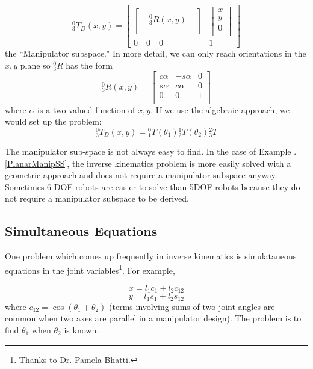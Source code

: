 \begin{ExampleSmall}
\[
^0_3T_D(x,y) =
\begin{bmatrix}
\begin{bmatrix}  &  &  \\  & ^0_3R(x,y) &   \\ & & \\ \end{bmatrix}      &
 \begin{bmatrix} x \\ y \\  0  \\ \end{bmatrix}            \\
 0 \quad 0 \quad 0      &   1
\end{bmatrix}
\]
the ``Manipulator subspace."  In more detail, we can only reach orientations in the $x,y$ plane so $^0_3R$ has the form
\[
{^0_3R}(x,y) =
   \begin{bmatrix}
          c\alpha	&   -s\alpha	&   0	\\
	  s\alpha	&    c\alpha	&   0	\\
	     0 		&     	0	&   1   \\
   \end{bmatrix}
\]
where $\alpha$ is a two-valued function of $x,y$.
If we use the algebraic approach, we would set up the problem:
\[
^0_3T_D(x,y) = {^0_1T}(\theta_1){^1_2T}(\theta_2){^2_3T}
\]
\end{ExampleSmall}

The manipulator sub-space is not always easy to find.  In the case of Example \thechapter.\ref{PlanarManipSS}, the inverse kinematics problem is more easily solved with a geometric approach and does not require a manipulator subspace anyway.  Sometimes 6 DOF robots are easier to solve than 5DOF robots because they do not require a manipulator subspace to be derived.





\subsection{Simultaneous Equations}

One problem which comes up frequently in inverse kinematics is simulataneous equations in the joint variables\footnote{Thanks to Dr. Pamela Bhatti.}.   For example,

\[
x = l_1c_1 + l_2c_{12}
\]
\[
y = l_1s_1 + l_2s_{12}
\]
where $c_{12} = \cos(\theta_1+\theta_2)$ (terms involving sums of two joint angles are common when two axes are parallel in a manipulator design).  The problem is to find $\theta_1$ when $\theta_2$ is known.

